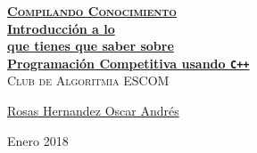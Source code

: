 \documentclass[12pt, fleqn]{report}                             %
\author{Oscar Andrés Rosas}                                     %
\theoremstyle{break}                                            %
\newcommand{\textCode}[1]  { \texttt{#1} }                      %
\newcommand{\Cpp}{\ignorespaces\textCode{C++}}                  %
\begin{document}
\begin{titlepage}
    
    \pagecolor{TitlePageColor}                                      %
    \color{white}                                                   %
    \newcommand{\Github}{https://compilandoconocimiento.github.io/Reference/} %

    \vspace                                                         %
    \baselineskip                                                   %

    \makebox[0pt][l]{\rule{1.3\textwidth}{3pt}}                     %
    
    \href{\Github}                                                  %
    {\textbf{\textsc{\Huge Compilando Conocimiento}}}\\[2.7cm]      %

    \href{\Github/LibroAnalisisVectorial}                           %
    {\fontsize{35}{46}\selectfont                                   %
        \textbf{Introducción a lo\\[0.6cm] 
        que tienes que saber sobre \\[0.4cm]
        Programación Competitiva usando \Cpp}}\\[0.5cm]             %
    \textcolor{ColorSubtext}{\textsc{\Huge Club de Algoritmia ESCOM}}%
    
    \vfill                                                          %
    
    \href{https://SoyOscarRH.github.io}                            %
    {\LARGE \textsf{Rosas Hernandez Oscar Andrés}}                 %


    \vspace                                                         %
    \baselineskip                                                   %
    
    {\large \textsf{Enero 2018}}                                    %

\end{titlepage}
\end{document}
